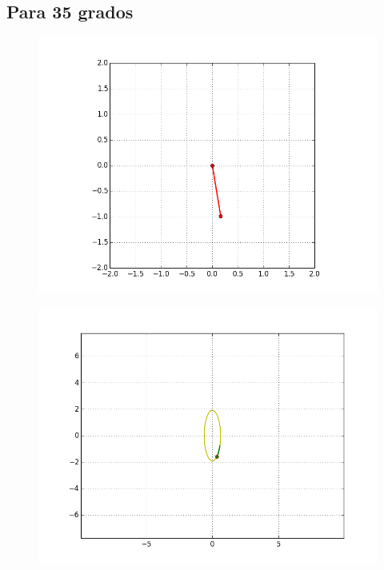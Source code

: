 \documentclass[12pt]{article}
\begin{document}
\subsection{Para 35 grados}
\begin{figure}[H]
\includegraphics[scale=.6]{35p}
\end{figure}
\begin{figure}[H]
\includegraphics[scale=.6]{35e}
\end{figure}
\end{document}
